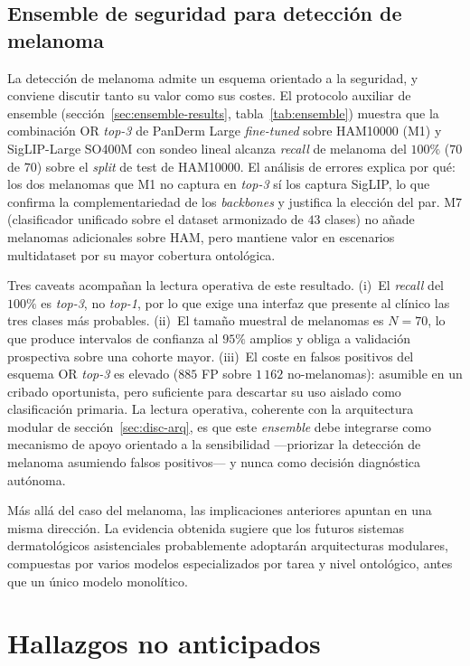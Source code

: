 \subsection{Ensemble de seguridad para detección de melanoma}
\label{sec:disc-ensemble}

La detección de melanoma admite un esquema orientado a la seguridad,
y conviene discutir tanto su valor como sus costes. El protocolo
auxiliar de ensemble (sección~\ref{sec:ensemble-results},
tabla~\ref{tab:ensemble}) muestra que la combinación OR
\emph{top-3} de PanDerm Large \emph{fine-tuned} sobre HAM10000 (M1)
y SigLIP-Large SO400M con sondeo lineal alcanza \emph{recall} de
melanoma del $100\%$ ($70$ de $70$) sobre el \emph{split} de
test de HAM10000. El análisis de errores explica por qué: los dos
melanomas que M1 no captura en \emph{top-3} sí los captura SigLIP,
lo que confirma la complementariedad de los \emph{backbones} y
justifica la elección del par. M7 (clasificador unificado sobre el
dataset armonizado de $43$ clases) no añade melanomas adicionales
sobre HAM, pero mantiene valor en escenarios multidataset por su
mayor cobertura ontológica.

Tres caveats acompañan la lectura operativa de este resultado.
(i)~El \emph{recall} del $100\%$ es \emph{top-3}, no
\emph{top-1}, por lo que exige una interfaz que presente al clínico
las tres clases más probables. (ii)~El tamaño muestral de melanomas
es $N = 70$, lo que produce intervalos de confianza al $95\%$
amplios y obliga a validación prospectiva sobre una cohorte mayor.
(iii)~El coste en falsos positivos del esquema OR \emph{top-3} es
elevado ($885$ FP sobre $1\,162$ no-melanomas): asumible en un
cribado oportunista, pero suficiente para descartar su uso aislado
como clasificación primaria. La lectura operativa, coherente con la
arquitectura modular de sección~\ref{sec:disc-arq}, es que este
\emph{ensemble} debe integrarse como mecanismo de apoyo orientado a la
sensibilidad ---priorizar la detección de melanoma asumiendo falsos
positivos--- y nunca como decisión diagnóstica autónoma.

Más allá del caso del melanoma, las implicaciones anteriores apuntan en
una misma dirección. La evidencia obtenida sugiere que los futuros
sistemas dermatológicos asistenciales probablemente adoptarán
arquitecturas modulares, compuestas por varios modelos especializados
por tarea y nivel ontológico, antes que un único modelo monolítico.

\section{Hallazgos no anticipados}
\label{sec:hallazgos}

